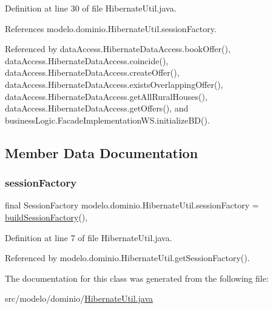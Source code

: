 Definition at line 30 of file Hibernate\+Util.\+java.


\begin{DoxyCode}{0}

\end{DoxyCode}


References modelo.\+dominio.\+Hibernate\+Util.\+session\+Factory.



Referenced by data\+Access.\+Hibernate\+Data\+Access.\+book\+Offer(), data\+Access.\+Hibernate\+Data\+Access.\+coincide(), data\+Access.\+Hibernate\+Data\+Access.\+create\+Offer(), data\+Access.\+Hibernate\+Data\+Access.\+exists\+Overlapping\+Offer(), data\+Access.\+Hibernate\+Data\+Access.\+get\+All\+Rural\+Houses(), data\+Access.\+Hibernate\+Data\+Access.\+get\+Offers(), and business\+Logic.\+Facade\+Implementation\+W\+S.\+initialize\+B\+D().



\subsection{Member Data Documentation}
\mbox{\label{classmodelo_1_1dominio_1_1HibernateUtil_a9d3cf851e2a9db5174c8cf9a5cc1dcad}} 
\subsubsection{\texorpdfstring{sessionFactory}{sessionFactory}}
{\footnotesize\ttfamily final Session\+Factory modelo.\+dominio.\+Hibernate\+Util.\+session\+Factory = \mbox{\hyperlink{classmodelo_1_1dominio_1_1HibernateUtil_a6a87317e9238a2010699289fbbc9be91}{build\+Session\+Factory}}()\hspace{0.3cm}{\ttfamily [static]}, {\ttfamily [private]}}



Definition at line 7 of file Hibernate\+Util.\+java.



Referenced by modelo.\+dominio.\+Hibernate\+Util.\+get\+Session\+Factory().



The documentation for this class was generated from the following file\+:\begin{DoxyCompactItemize}
\item 
src/modelo/dominio/\mbox{\hyperlink{HibernateUtil_8java}{Hibernate\+Util.\+java}}\end{DoxyCompactItemize}
